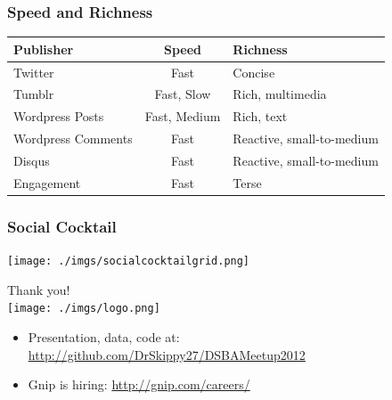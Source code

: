 \documentclass{beamer}
\begin{document}
\begin{frame} \frametitle{Speed and Richness}
\begin{table}
\begin{tabular}{m{2cm}| c |m{3cm}}
\hline
   {Publisher}   &   {Speed} & {Richness} \\
\hline 
    Twitter       & Fast & Concise  \\ [3pt]
    Tumblr       & Fast, Slow & Rich, multimedia\\  [3pt]
    Wordpress Posts & Fast, Medium &  Rich, text\\  [3pt]
    Wordpress Comments  & Fast & Reactive, small-to-medium\\  [3pt]
    Disqus         & Fast & Reactive, small-to-medium\\  [3pt]
    Engagement   & Fast & Terse\\ 
\hline
\end{tabular}
\end{table}
\end{frame}


\begin{frame}\frametitle{Social Cocktail}
  \begin{center}
    \texttt{[image: ./imgs/socialcocktailgrid.png]}
  \end{center}
\end{frame}


\begin{frame}
  \begin{center}
    {\Large Thank you!}  \\ [20pt]
    \texttt{[image: ./imgs/logo.png]} \\ [15pt]
    \begin{itemize}
    \item Presentation, data, code at: \url{http://github.com/DrSkippy27/DSBAMeetup2012}
    \item Gnip is hiring: \url{http://gnip.com/careers/}
    \end{itemize}
  \end{center}
\end{frame}
\end{document}

